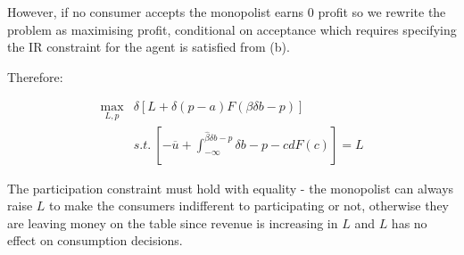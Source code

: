 \documentclass{article}
\begin{document}
However, if no consumer accepts the monopolist earns 0 profit so we rewrite the 
problem as maximising profit, conditional on acceptance which requires 
specifying the IR constraint for the agent is satisfied from (b).


Therefore:

\begin{align*}
    \max_{L,p} &\delta \left[
    L + \delta (p-a) F(\beta \delta b - p)
    \right]  \\
    & s.t. \ \left[ 
        -\overline{u} + \int^{\hat{\beta}\delta b - p}_{-\infty} \delta b - p - c dF(c)
        \right] = L
\end{align*}


The participation constraint must hold with equality - the monopolist can 
always raise $L$ to make the consumers indifferent to participating or not, 
otherwise they are leaving money on the table since revenue is increasing in $L$ 
and $L$ has no effect on consumption decisions.
\end{document}
